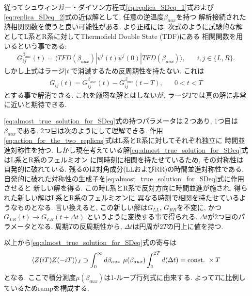 従ってシュウィンガー・ダイソン方程式\eqref{eq:replica_SDeq_1}式および
\eqref{eq:replica_SDeq_2}式の近似解として, 任意の逆温度$\beta_{aux}$を持つ
解析接続された熱相関関数を使うと良い可能性がある. 
より正確には, 次式のように試験的な解としてL系とR系に対してThermofield Double State (TDF)にある
相関関数を用いるという事である:
\begin{align}
	G_{ij}^{\beta_{aux}}(t)
	= \langle TFD(\beta_{aux})|\psi^i(t)\psi^j(0)|TFD(\beta_{aux}) \rangle,
	\hspace{20pt}i,j \in \{L, R\}.
\end{align}
しかし上式はラージ$|t|$で消滅するため反周期性を持たない. 
これは
\begin{align}
	G_{ij}(t) = G_{ij}^{\beta_{aux}}(t) - G_{ij}^{\beta_{aux}}(t-T),\hspace{20pt}
	0 < t < T
	\label{eq:almost_true_solution_for_SDeq}
\end{align}
とする事で解消できる. 
これを厳密な解とはしないが, ラージ$T$では真の解に非常に近いと期待できる. 

\eqref{eq:almost_true_solution_for_SDeq}式の持つパラメータは２つあり, 
1つ目は$\beta_{aux}$である. 
2つ目は次のようにして理解できる. 
作用\eqref{eq:action_for_the_two_replicas}式はL系とR系に対してそれぞれ独立に
時間並進対称性を持つ. 
しかし現在考えている解\eqref{eq:almost_true_solution_for_SDeq}式はL系とR系のフェルミオン
に同時刻に相関を持たせているため, その対称性は自発的に破れている. 
残るのは対角成分(LLおよびRR)の時間並進対称性である. 
自発的に破れた対称性の生成子を\eqref{eq:almost_true_solution_for_SDeq}式に作用させると
新しい解を得る. 
この時L系とR系で反対方向に時間並進が施され, 得られた新しい解はL系とR系のフェルミオンに
異なる時刻で相関を持たせているようなものとなる. 
言い換えると, この新しい解は$G_{LL}$, $G_{RR}$を不変に, かつ$G_{LR}(t) \to G_{LR}(t + \Delta t)$
というように変換する事で得られる. 
$\Delta t$が2つ目のパラメータとなる. 
周期$T$の反周期性から, $\Delta t$は円周が$2T$の円上に値を持つ. 

以上から\eqref{eq:almost_true_solution_for_SDeq}式の寄与は
\begin{align}
	\langle Z(iT)Z(-iT) \rangle_J \supset
	\int_0^{\infty}d\beta_{aux}\ \mu(\beta_{aux})
	\int_0^{2T} d(\Delta t)
	= \mathrm{const.}\ \times T
\end{align}
となる. 
ここで積分測度$\mu(\beta_{aux})$は1-ループ行列式に由来する. 
よって$T$に比例しているためrampを構成する. 

